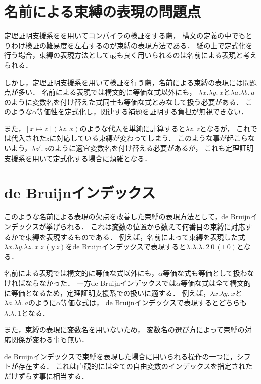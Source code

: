 \documentclass{sumiilab-paper}
\begin{document}
\section{名前による束縛の表現の問題点}
定理証明支援系をを用いてコンパイラの検証をする際，
構文の定義の中でもとりわけ検証の難易度を左右するのが束縛の表現方法である．
紙の上で定式化を行う場合，束縛の表現方法として最も良く用いられるのは名前による表現と考えられる．

しかし，定理証明支援系を用いて検証を行う際，名前による束縛の表現には問題点が多い．
名前による表現では構文的に等価な式以外にも，
$\lambda x.\lambda y.~x$と$\lambda a.\lambda b.~a$のように変数名を付け替えた式同士も等価な式とみなして扱う必要がある．
このような$\alpha$等価性を定式化し，関連する補題を証明する負担が無視できない．

また，$[x \mapsto z](\lambda z.~x)$のような代入を単純に計算すると$\lambda z.~z$となるが，
これでは代入された$z$に対応している束縛が変わってしまう．
このような事が起こらないよう，$\lambda z'.~z$のように適宜変数名を付け替える必要があるが，
これも定理証明支援系を用いて定式化する場合に煩雑となる．

\section{de Bruijnインデックス}
このような名前による表現の欠点を改善した束縛の表現方法として，de Bruijnインデックスが挙げられる．
これは変数の位置から数えて何番目の束縛に対応するかで束縛を表現するものである．
例えば，名前によって束縛を表現した式$\lambda x. \lambda y. \lambda z.~x~z~(y~z)$をde Bruijnインデックスで表現すると$\lambda. \lambda. \lambda.~2~0~(1~0)$となる．

名前による表現では構文的に等価な式以外にも，$\alpha$等価な式も等価として扱わなければならなかった．
一方de Bruijnインデックスでは$\alpha$等価な式は全て構文的に等価となるため，定理証明支援系での扱いに適する．
例えば，$\lambda x.\lambda y.~x$と$\lambda a.\lambda b.~a$のように$\alpha$等価な式は，
de Bruijnインデックスで表現するとどちらも$\lambda.\lambda.~1$となる．

また，束縛の表現に変数名を用いないため，
変数名の選び方によって束縛の対応関係が変わる事も無い．

de Bruijnインデックスで束縛を表現した場合に用いられる操作の一つに，シフトが存在する．
これは直観的には全ての自由変数のインデックスを指定されただけずらす事に相当する．
\end{document}
